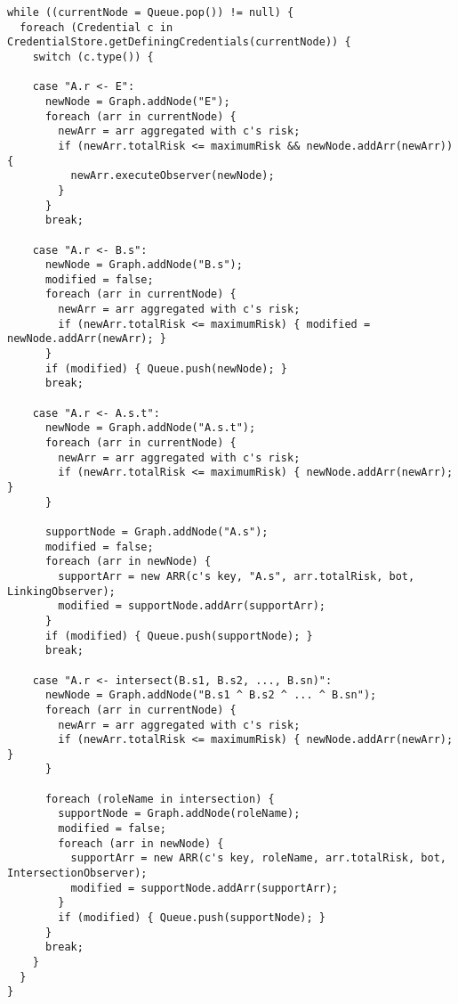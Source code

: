 %
%
\begin{verbatim}
while ((currentNode = Queue.pop()) != null) {
  foreach (Credential c in CredentialStore.getDefiningCredentials(currentNode)) {
    switch (c.type()) {

    case "A.r <- E":
      newNode = Graph.addNode("E");
      foreach (arr in currentNode) {
        newArr = arr aggregated with c's risk;
        if (newArr.totalRisk <= maximumRisk && newNode.addArr(newArr)) {
          newArr.executeObserver(newNode);
        }
      }
      break;

    case "A.r <- B.s":
      newNode = Graph.addNode("B.s");
      modified = false;
      foreach (arr in currentNode) {
        newArr = arr aggregated with c's risk;
        if (newArr.totalRisk <= maximumRisk) { modified = newNode.addArr(newArr); }
      }
      if (modified) { Queue.push(newNode); }
      break;

    case "A.r <- A.s.t":
      newNode = Graph.addNode("A.s.t");
      foreach (arr in currentNode) {
        newArr = arr aggregated with c's risk;
        if (newArr.totalRisk <= maximumRisk) { newNode.addArr(newArr); }
      }

      supportNode = Graph.addNode("A.s");
      modified = false;
      foreach (arr in newNode) {
        supportArr = new ARR(c's key, "A.s", arr.totalRisk, bot, LinkingObserver);
        modified = supportNode.addArr(supportArr);
      }
      if (modified) { Queue.push(supportNode); }
      break;

    case "A.r <- intersect(B.s1, B.s2, ..., B.sn)":
      newNode = Graph.addNode("B.s1 ^ B.s2 ^ ... ^ B.sn");
      foreach (arr in currentNode) {
        newArr = arr aggregated with c's risk;
        if (newArr.totalRisk <= maximumRisk) { newNode.addArr(newArr); }
      }

      foreach (roleName in intersection) {
        supportNode = Graph.addNode(roleName);
        modified = false;
        foreach (arr in newNode) {
          supportArr = new ARR(c's key, roleName, arr.totalRisk, bot, IntersectionObserver);
          modified = supportNode.addArr(supportArr);
        }
        if (modified) { Queue.push(supportNode); }
      }
      break;
    }
  }
}
\end{verbatim}
